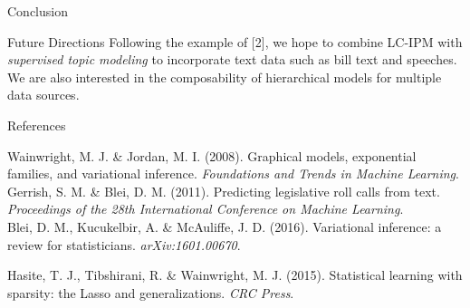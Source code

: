 \documentclass[final]{beamer}
\newlength{\onecolwid}
\begin{document}
\begin{frame}[t]
\begin{columns}[t]
\begin{column}{\onecolwid}
\begin{block}{Conclusion}
\begin{table}
\end{table}

\end{block}


\begin{block}{Future Directions}
Following the example of [2], we hope to combine LC-IPM with {\itshape supervised topic modeling} to incorporate text data such as bill text and speeches. We are also interested in the composability of hierarchical models for multiple data sources. 


\end{block}


\begin{block}{References}

\tiny{

\noindent[1] Wainwright, M. J. \& Jordan, M. I. (2008). Graphical models, exponential families, and variational inference. {\itshape Foundations and Trends in Machine Learning}. \\

\noindent[2] Gerrish, S. M. \& Blei, D. M. (2011). Predicting legislative roll calls from text. {\itshape Proceedings of the 28th International Conference on Machine Learning}. \\

\noindent[3] Blei, D. M., Kucukelbir, A. \& McAuliffe, J. D. (2016). Variational inference: a review for statisticians. {\itshape arXiv:1601.00670}.

\noindent[4] Hasite, T. J., Tibshirani, R. \& Wainwright, M. J. (2015). Statistical learning with sparsity: the Lasso and generalizations. {\itshape CRC Press}. 
}
\end{block}


\end{column}
\end{columns}
\end{frame}
\end{document}
